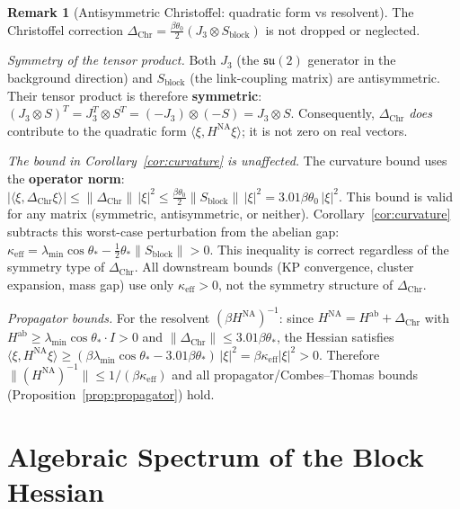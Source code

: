 \documentclass[11pt]{article}
\theoremstyle{definition}
\newtheorem{remark}[theorem]{Remark}
\newcommand{\su}{\mathfrak{su}}
\begin{document}
\begin{remark}[Antisymmetric Christoffel: quadratic form vs resolvent]%
\label{rem:antisym-resolvent}
The Christoffel correction $\Delta_{\mathrm{Chr}}
=\frac{\beta\theta_0}{2}(J_3\otimes S_{\mathrm{block}})$
is not dropped or neglected.

\emph{Symmetry of the tensor product.}
Both $J_3$ (the $\su(2)$ generator in the background direction)
and $S_{\mathrm{block}}$ (the link-coupling matrix) are
antisymmetric.  Their tensor product is therefore
\textbf{symmetric}:
$(J_3\otimes S)^T=J_3^T\otimes S^T=(-J_3)\otimes(-S)
=J_3\otimes S$.
Consequently, $\Delta_{\mathrm{Chr}}$ \emph{does}
contribute to the quadratic form
$\langle\xi,H^{\mathrm{NA}}\xi\rangle$; it is not
zero on real vectors.

\emph{The bound in Corollary~\ref{cor:curvature} is
unaffected.}
The curvature bound uses the \textbf{operator norm}:
$|\langle\xi,\Delta_{\mathrm{Chr}}\xi\rangle|
\le\|\Delta_{\mathrm{Chr}}\|\,|\xi|^2
\le\frac{\beta\theta_0}{2}\|S_{\mathrm{block}}\|\,|\xi|^2
=3.01\beta\theta_0\,|\xi|^2$.
This bound is valid for any matrix
(symmetric, antisymmetric, or neither).
Corollary~\ref{cor:curvature} subtracts this
worst-case perturbation from the abelian gap:
$\kappa_{\mathrm{eff}}
=\lambda_{\min}\cos\theta_*
-\tfrac{1}{2}\theta_*\|S_{\mathrm{block}}\|>0$.
This inequality is correct regardless of the symmetry
type of $\Delta_{\mathrm{Chr}}$.  All downstream bounds
(KP convergence, cluster expansion, mass gap) use only
$\kappa_{\mathrm{eff}}>0$, not the symmetry structure
of $\Delta_{\mathrm{Chr}}$.

\emph{Propagator bounds.}
For the resolvent $(\beta H^{\mathrm{NA}})^{-1}$:
since $H^{\mathrm{NA}}=H^{\mathrm{ab}}+\Delta_{\mathrm{Chr}}$
with $H^{\mathrm{ab}}\ge\lambda_{\min}\cos\theta_*\cdot I>0$
and $\|\Delta_{\mathrm{Chr}}\|\le 3.01\beta\theta_*$,
the Hessian satisfies
$\langle\xi,H^{\mathrm{NA}}\xi\rangle
\ge(\beta\lambda_{\min}\cos\theta_*-3.01\beta\theta_*)\,|\xi|^2
=\beta\kappa_{\mathrm{eff}}|\xi|^2>0$.
Therefore $\|(H^{\mathrm{NA}})^{-1}\|\le 1/(\beta\kappa_{\mathrm{eff}})$
and all propagator/Combes--Thomas bounds
(Proposition~\ref{prop:propagator}) hold.
\end{remark}

\section{Algebraic Spectrum of the Block Hessian}\label{sec:algebraic}
\end{document}
